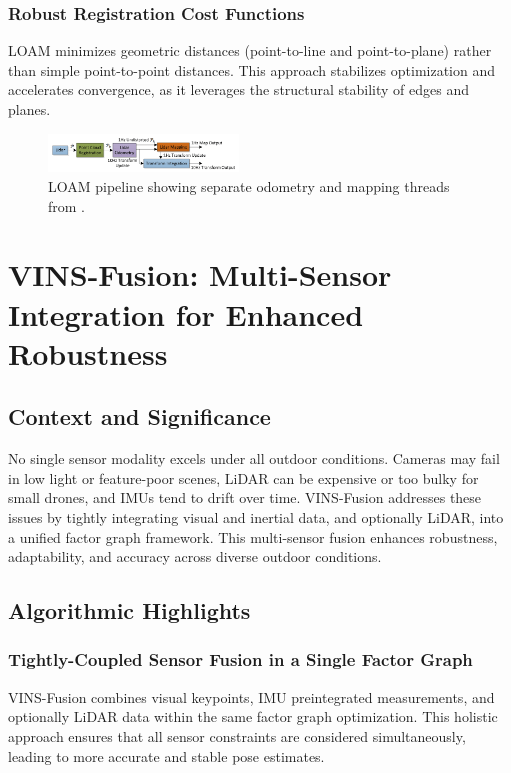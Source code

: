 \documentclass[conference]{IEEEtran}
\begin{document}
\subsubsection{Robust Registration Cost Functions}
LOAM minimizes geometric distances (point-to-line and point-to-plane) rather than simple point-to-point distances. This approach stabilizes optimization and accelerates convergence, as it leverages the structural stability of edges and planes.

\begin{figure}[htbp]
\centerline{\includegraphics[width=0.45\textwidth]{loam.png}}
\caption{LOAM pipeline showing separate odometry and mapping threads from \cite{2}.}
\label{fig:loam}
\end{figure}

\section{VINS-Fusion: Multi-Sensor Integration for Enhanced Robustness}
\subsection{Context and Significance}
No single sensor modality excels under all outdoor conditions. Cameras may fail in low light or feature-poor scenes, LiDAR can be expensive or too bulky for small drones, and IMUs tend to drift over time. VINS-Fusion \cite{3} addresses these issues by tightly integrating visual and inertial data, and optionally LiDAR, into a unified factor graph framework. This multi-sensor fusion enhances robustness, adaptability, and accuracy across diverse outdoor conditions.

\subsection{Algorithmic Highlights}
\subsubsection{Tightly-Coupled Sensor Fusion in a Single Factor Graph}
VINS-Fusion combines visual keypoints, IMU preintegrated measurements, and optionally LiDAR data within the same factor graph optimization. This holistic approach ensures that all sensor constraints are considered simultaneously, leading to more accurate and stable pose estimates.
\end{document}
